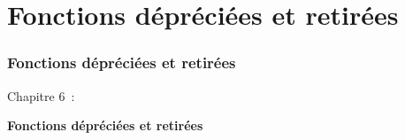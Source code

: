 %

\section{Fonctions dépréciées et retirées}
\begin{frame}[fragile]
	\frametitle{Fonctions dépréciées et retirées}

	\begin{center}\huge{Chapitre 6~:}\end{center}
	\begin{center}\huge{\color{typo3darkgrey}\textbf{Fonctions dépréciées et retirées}}\end{center}

\end{frame}


